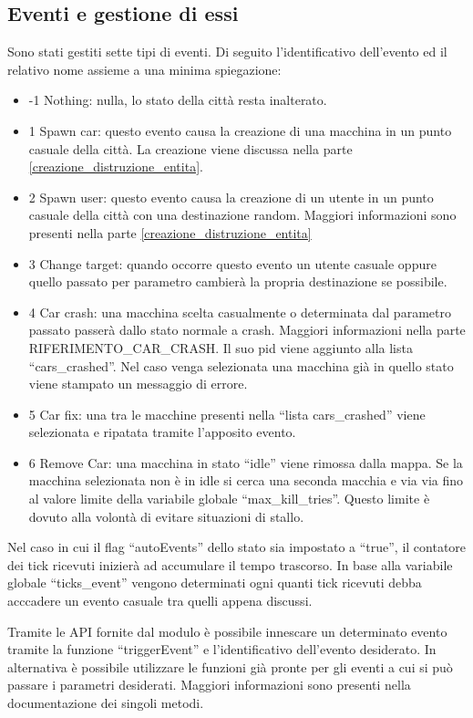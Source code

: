 \subsection{Eventi e gestione di essi}\label{env_events}
Sono stati gestiti sette tipi di eventi. Di seguito l'identificativo dell'evento ed il relativo nome assieme a una minima spiegazione:
\begin{itemize}
	\item -1 Nothing: nulla, lo stato della città resta inalterato.
	\item 1 Spawn car: questo evento causa la creazione di una macchina in un punto casuale della città. La creazione viene discussa nella parte \ref{creazione_distruzione_entita}.
	\item 2 Spawn user: questo evento causa la creazione di un utente in un punto casuale della città con una destinazione random. Maggiori informazioni sono presenti nella parte \ref{creazione_distruzione_entita}
	\item 3 Change target: quando occorre questo evento un utente casuale oppure quello passato per parametro cambierà la propria destinazione se possibile.
	\item 4 Car crash: una macchina scelta casualmente o determinata dal parametro passato passerà dallo stato normale a crash. Maggiori informazioni nella parte RIFERIMENTO\_CAR\_CRASH. Il suo pid viene aggiunto alla lista ``cars\_crashed''. Nel caso venga selezionata una macchina già in quello stato viene stampato un messaggio di errore.
	\item 5 Car fix: una tra le macchine presenti nella ``lista cars\_crashed'' viene selezionata e ripatata tramite l'apposito evento. 
	\item 6 Remove Car: una macchina in stato ``idle'' viene rimossa dalla mappa. Se la macchina selezionata non è in idle si cerca una seconda macchia e via via fino al valore limite della variabile globale ``max\_kill\_tries''. Questo limite è dovuto alla volontà di evitare situazioni di stallo.
\end{itemize}

Nel caso in cui il flag ``autoEvents'' dello stato sia impostato a ``true'', il contatore dei tick ricevuti inizierà ad accumulare il tempo trascorso. In base alla variabile globale ``ticks\_event'' vengono determinati ogni quanti tick ricevuti debba acccadere un evento casuale tra quelli appena discussi.

Tramite le API fornite dal modulo è possibile innescare un determinato evento tramite la funzione ``triggerEvent'' e l'identificativo dell'evento desiderato. In alternativa è possibile utilizzare le funzioni già pronte per gli eventi a cui si può passare i parametri desiderati. Maggiori informazioni sono presenti nella documentazione dei singoli metodi.


